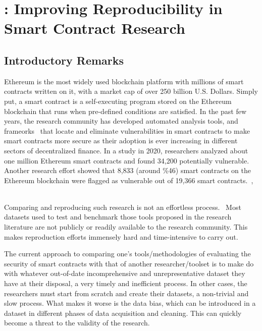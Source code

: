 \chapter{\etherbase: Improving Reproducibility in Smart Contract Research} \label{ch:etherbase}


\section{Introductory Remarks}
    \label{sec:intro}
    Ethereum is the most widely used blockchain platform with millions of smart contracts written on it, with a market cap of over 250 billion U.S. Dollars.
    Simply put, a smart contract is a self-executing program stored on the Ethereum blockchain that runs when pre-defined conditions are satisfied.
    In the past few years, the research community has developed automated analysis tools, and frameorks~\cite{ref_tools} that locate and eliminate vulnerabilities in smart contracts to make smart contracts more secure as their adoption is ever increasing in different sectors of decentralized finance.
    In a study in 2020, researchers analyzed about one million Ethereum smart contracts and found 34,200 potentially vulnerable.~\cite{ref_flag1}
    Another research effort showed that 8,833 (around \%46) smart contracts on the Ethereum blockchain were flagged as vulnerable out of 19,366 smart contracts.~\cite{ref_flag2}, ~\cite{Empirical-Evaluation-of-Smart-Contract-Testing:What-is-the-Best-Choice}

    Comparing and reproducing such research is not an effortless process.~\cite{Empirical-Evaluation-of-Smart-Contract-Testing:What-is-the-Best-Choice}
    Most datasets used to test and benchmark those tools proposed in the research literature are not publicly or readily available to the research community.
    This makes reproduction efforts immensely hard and time-intensive to carry out.

    The current approach to comparing one's tools/methodologies of evaluating the security of smart contracts with that of another researcher/toolset is to make do with whatever out-of-date incomprehensive and unrepresentative dataset they have at their disposal, a very timely and inefficient process.
    In other cases, the researchers must start from scratch and create their datasets, a non-trivial and slow process.
    What makes it worse is the data bias, which can be introduced in a dataset in different phases of data acquisition and cleaning.
    This can quickly become a threat to the validity of the research.~\cite{Empirical-Evaluation-of-Smart-Contract-Testing:What-is-the-Best-Choice}

